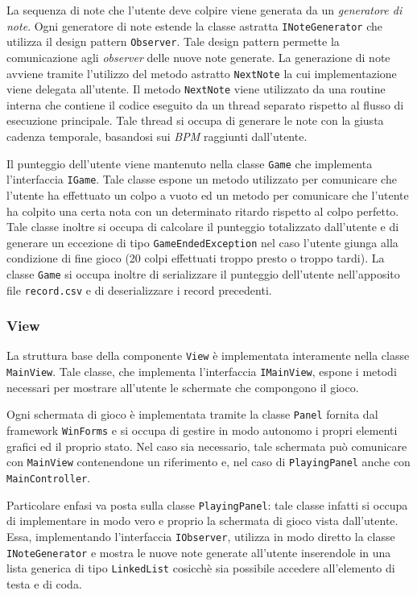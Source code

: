 La sequenza di note che l'utente deve colpire viene generata da un \emph{generatore di note}. Ogni generatore di note estende la classe astratta \texttt{INoteGenerator} che utilizza il design pattern \texttt{Observer}. Tale design pattern permette la comunicazione agli \emph{observer} delle nuove note generate.
La generazione di note avviene tramite l'utilizzo del metodo astratto \texttt{NextNote} la cui implementazione viene delegata all'utente.
Il metodo \texttt{NextNote} viene utilizzato da una routine interna che contiene il codice eseguito da un thread separato rispetto al flusso di esecuzione principale.
Tale thread si occupa di generare le note con la giusta cadenza temporale, basandosi sui \emph{BPM} raggiunti dall'utente.

Il punteggio dell'utente viene mantenuto nella classe \texttt{Game} che implementa l'interfaccia \texttt{IGame}. Tale classe espone un metodo utilizzato per comunicare che l'utente ha effettuato un colpo a vuoto ed un metodo per comunicare che l'utente ha colpito una certa nota con un determinato ritardo rispetto al colpo perfetto.
Tale classe inoltre si occupa di calcolare il punteggio totalizzato dall'utente e di generare un eccezione di tipo \texttt{GameEndedException} nel caso l'utente giunga alla condizione di fine gioco (20 colpi effettuati troppo presto o troppo tardi).
La classe \texttt{Game} si occupa inoltre di serializzare il punteggio dell'utente nell'apposito file \texttt{record.csv} e di deserializzare i record precedenti.

\subsubsection{View}
La struttura base della componente \texttt{View} è implementata interamente nella classe \texttt{MainView}. Tale classe, che implementa l'interfaccia \texttt{IMainView}, espone i metodi necessari per mostrare all'utente le schermate che compongono il gioco.

Ogni schermata di gioco è implementata tramite la classe \texttt{Panel} fornita dal framework \texttt{WinForms} e si occupa di gestire in modo autonomo i propri elementi grafici ed il proprio stato.
Nel caso sia necessario, tale schermata può comunicare con \texttt{MainView} contenendone un riferimento e, nel caso di \texttt{PlayingPanel} anche con \texttt{MainController}.

\vspace{0.5cm}
Particolare enfasi va posta sulla classe \texttt{PlayingPanel}: tale classe infatti si occupa di implementare in modo vero e proprio la schermata di gioco vista dall'utente.
Essa, implementando l'interfaccia \texttt{IObserver}, utilizza in modo diretto la classe \texttt{INoteGenerator} e mostra le nuove note generate all'utente inserendole in una lista generica di tipo \texttt{LinkedList} cosicchè sia possibile accedere all'elemento di testa e di coda.

